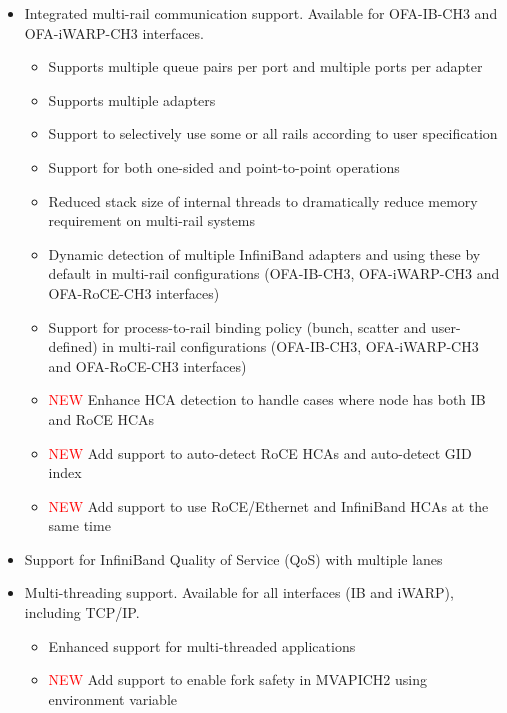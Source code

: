 \begin{itemize}
  \item 
    Integrated multi-rail communication support. Available for
    OFA-IB-CH3 and OFA-iWARP-CH3 interfaces.
    \begin{itemize}
        \item  Supports multiple queue pairs per port and 
             multiple ports per adapter 
	\item  Supports multiple adapters 
        \item  Support to selectively use 
             some or
             all rails according to user specification
	\item  Support for both one-sided and point-to-point operations 
        \item  Reduced stack size of internal threads to dramatically reduce 
	      memory requirement on multi-rail
        systems
	\item  Dynamic detection of multiple InfiniBand adapters 
	     and using these by default in multi-rail configurations (OFA-IB-CH3, OFA-iWARP-CH3 and OFA-RoCE-CH3 interfaces)
	\item  Support for process-to-rail binding policy (bunch, scatter and  user-defined) 
	     in multi-rail configurations (OFA-IB-CH3, OFA-iWARP-CH3 and OFA-RoCE-CH3 interfaces)
    \item  \textcolor{red}{NEW} Enhance HCA detection to handle cases where node has both IB and RoCE HCAs
    \item  \textcolor{red}{NEW} Add support to auto-detect RoCE HCAs and
        auto-detect GID index
    \item  \textcolor{red}{NEW} Add support to use RoCE/Ethernet and InfiniBand
        HCAs at the same time
    \end{itemize}
  

  \item  Support for InfiniBand Quality of Service (QoS) with multiple lanes

  \item 
    Multi-threading support. Available for all interfaces (IB and iWARP),
    including TCP/IP.
    \begin{itemize}
      \item  Enhanced support for multi-threaded applications
      \item \textcolor{red}{NEW}  Add support to enable fork safety in MVAPICH2 using environment variable
    \end{itemize}
  


\end{itemize}
